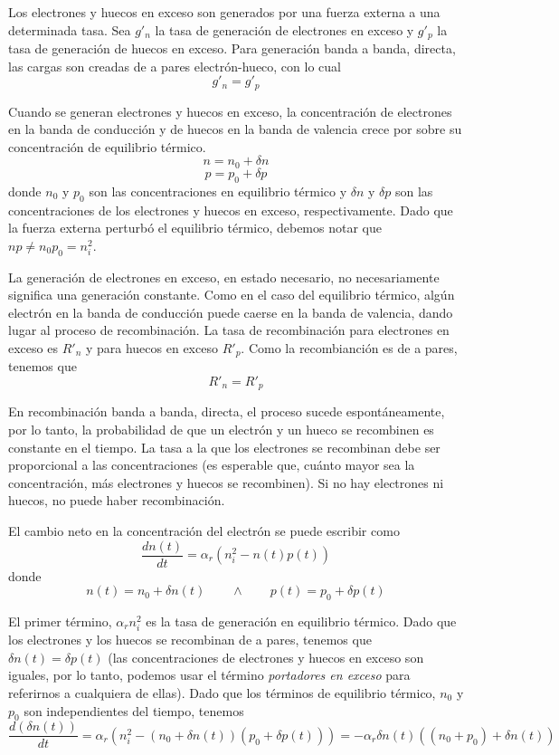 \documentclass[12pt,a4paper]{article}
\begin{document}
Los electrones y huecos en exceso son generados por una fuerza externa a una determinada tasa. Sea $g'_{n}$ la tasa de generación de electrones en exceso y $g'_{p}$ la tasa de generación de huecos en exceso. Para generación banda a banda, directa, las cargas son creadas de a pares electrón-hueco, con lo cual
\[ g'_{n}=g'_{p} \]

Cuando se generan electrones y huecos en exceso, la concentración de electrones en la banda de conducción y de huecos en la banda de valencia crece por sobre su concentración de equilibrio térmico.
\[ n=n_{0} + \delta n \]
\[ p=p_{0} + \delta p \]
donde $n_{0}$ y $p_{0}$ son las concentraciones en equilibrio térmico y $\delta n$ y $\delta p$ son las concentraciones de los electrones y huecos en exceso, respectivamente. Dado que la fuerza externa perturbó el equilibrio térmico, debemos notar que $np\neq n_{0}p_{0} = n_{i}^{2}$.

La generación de electrones en exceso, en estado necesario, no necesariamente significa una generación constante. Como en el caso del equilibrio térmico, algún electrón en la banda de conducción puede caerse en la banda de valencia, dando lugar al proceso de recombinación. La tasa de recombinación para electrones en exceso es $R'_{n}$ y para huecos en exceso $R'_{p}$. Como la recombianción es de a pares, tenemos que
\[ R'_{n}=R'_{p} \]

En recombinación banda a banda, directa, el proceso sucede espontáneamente, por lo tanto, la probabilidad de que un electrón y un hueco se recombinen es constante en el tiempo. La tasa a la que los electrones se recombinan debe ser proporcional a las concentraciones (es esperable que, cuánto mayor sea la concentración, más electrones y huecos se recombinen). Si no hay electrones ni huecos, no puede haber recombinación.

El cambio neto en la concentración del electrón se puede escribir como
\[ \frac{dn(t)}{dt} = \alpha _{r} (n_{i}^{2}-n(t)p(t)) \]
donde
\[ n(t)=n_{0}+\delta n(t) \qquad \wedge \qquad p(t)=p_{0} + \delta p(t) \]

El primer término, $\alpha _{r} n_{i}^{2}$ es la tasa de generación en equilibrio térmico. Dado que los electrones y los huecos se recombinan de a pares, tenemos que $\delta n(t)=\delta p(t)$ (las concentraciones de electrones y huecos en exceso son iguales, por lo tanto, podemos usar el término \emph{portadores en exceso} para referirnos a cualquiera de ellas). Dado que los términos de equilibrio térmico, $n_{0}$ y $p_{0}$ son independientes del tiempo, tenemos
\[ \frac{d(\delta n(t))}{dt} = \alpha _{r} (n_{i}^{2}-(n_{0}+\delta n(t))(p_{0} + \delta p(t))) = -\alpha _{r} \delta n(t)((n_{0}+p_{0})+ \delta n(t)) \]
\end{document}
